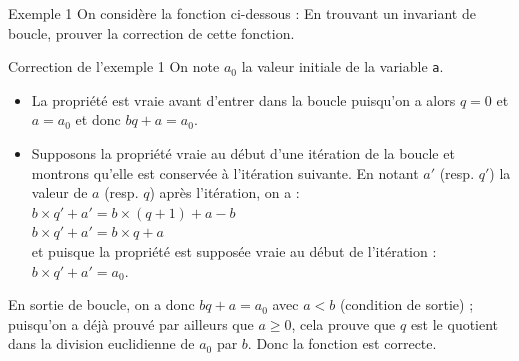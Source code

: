 \documentclass[10pt]{beamer}
\begin{document}
\begin{frame}[fragile]{\Ctitle}{\stitle}
	\begin{exampleblock}{Exemple 1}
		On considère la fonction ci-dessous :
		\onslide<2-> En trouvant un invariant de boucle, prouver la correction de cette fonction.
	\end{exampleblock}
\end{frame}

\begin{frame}[fragile]{\Ctitle}{\stitle}
	\begin{exampleblock}{Correction de l'exemple 1}
		\textcolor{OliveGreen}{On note $a_0$ la valeur initiale de la variable {\tt a}.}
		\onslide<2->{\textcolor{OliveGreen}{Montrons que la propriété : \\}   \og{} $a_0 = bq + a$ \fg{}  \textcolor{OliveGreen}{est un invariant de boucle.}}
		\begin{itemize}
			\item<4-> \textcolor{OliveGreen}{La propriété est vraie avant d'entrer dans la boucle puisqu'on a alors $q=0$ et $a = a_0$ et donc $bq + a = a_0$.}
			\item<5-> \textcolor{OliveGreen}{Supposons la propriété vraie au début d'une itération de la boucle et montrons qu'elle est conservée à l'itération suivante. En notant $a'$ (resp. $q'$) la valeur de $a$ (resp. $q$) après l'itération, on a : \\
					$b \times q' + a' = b \times (q+1) + a - b$ \\
					$b \times q' + a' = b \times q + a $ \\ et puisque la propriété est supposée vraie au début de l'itération :
					$b \times q' + a' = a_0$.\\
				}
		\end{itemize}
		\textcolor{OliveGreen}{En sortie de boucle, on a donc $bq + a = a_0$ avec $a < b$ (condition de sortie) ; puisqu'on a déjà prouvé par ailleurs que $a \geqslant 0$, cela prouve que $q$ est le quotient dans la division euclidienne de $a_0$ par $b$. Donc la fonction est correcte.}
	\end{exampleblock}
\end{frame}
\end{document}
